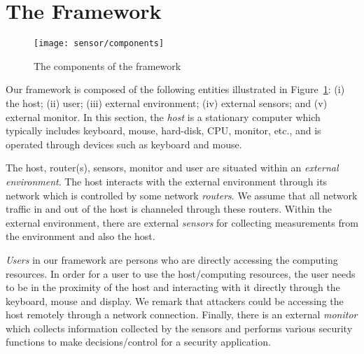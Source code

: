 \section{The Framework}
\label{sec:sensor-framework}

\begin{figure}[htb]
\centering
\texttt{[image: sensor/components]}
\caption{The components of the framework} \label{fig:components}
\end{figure}

Our framework is composed of the following
entities illustrated in Figure~\ref{fig:components}:
(i) the host;
(ii) user;
(iii) external environment;
(iv) external sensors;
and (v) external monitor.
In this section, the {\em host} is a stationary computer which typically includes
keyboard, mouse, hard-disk, CPU, monitor, etc., and is operated through 
devices such as keyboard and mouse.

The host, router(s), sensors, monitor and user are situated within
an {\em external environment}.
The host interacts with the external environment through its network
which is controlled by some network {\em routers}.
We assume that all network traffic in and out of the host is
channeled through these routers.
Within the external environment, there are external {\em sensors} for
collecting measurements from the environment and also the host.

{\em Users} in our framework are persons who are
directly accessing the computing resources.
In order for a user to use the host/computing resources, the user
needs to be in the proximity of the host and interacting with it directly
through the keyboard, mouse and display.
We remark that attackers could be accessing the host remotely through
a network connection.
Finally, there is an external {\em monitor} which collects information
collected by the sensors and performs various security functions to
make decisions/control for a security application.


